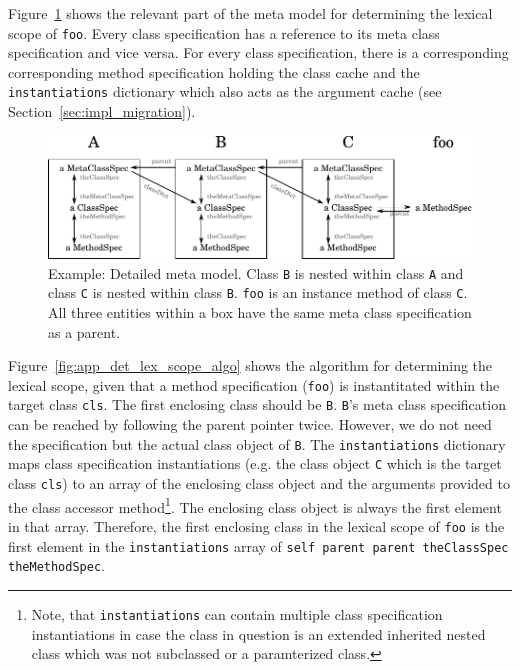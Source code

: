 Figure~\ref{fig:app_lex_scope} shows the relevant part of the meta model for determining the lexical scope of \texttt{foo}. Every class specification has a reference to its meta class specification and vice versa. For every class specification, there is a corresponding corresponding method specification holding the class cache and the \texttt{instantiations} dictionary which also acts as the argument cache (see Section~\ref{sec:impl_migration}).

\begin{figure}[!htp]
\includegraphics[width=\textwidth]{lexical_scope_app_ex.pdf}
\caption[Example: Detailed meta model]{Example: Detailed meta model. Class \texttt{B} is nested within class \texttt{A} and class \texttt{C} is nested within class \texttt{B}. \texttt{foo} is an instance method of class \texttt{C}. All three entities within a box have the same meta class specification as a parent.}
\label{fig:app_lex_scope}
\end{figure}

Figure~\ref{fig:app_det_lex_scope_algo} shows the algorithm for determining the lexical scope, given that a method specification (\texttt{foo}) is instantitated within the target class \texttt{cls}. The first enclosing class should be \texttt{B}. \texttt{B}'s meta class specification can be reached by following the parent pointer twice. However, we do not need the specification but the actual class object of \texttt{B}. The \texttt{instantiations} dictionary maps class specification instantiations (e.g. the class object \texttt{C} which is the target class \texttt{cls}) to an array of the enclosing class object and the arguments provided to the class accessor method\footnote{Note, that \texttt{instantiations} can contain multiple class specification instantiations in case the class in question is an extended inherited nested class which was not subclassed or a paramterized class.}. The enclosing class object is always the first element in that array. Therefore, the first enclosing class in the lexical scope of \texttt{foo} is the first element in the \texttt{instantiations} array of \texttt{self parent parent theClassSpec theMethodSpec}.

